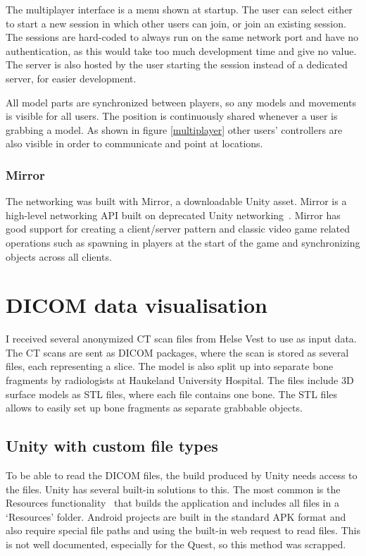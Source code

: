 \documentclass[a4paper]{report}
\begin{document}
The multiplayer interface is a menu shown at startup. The user can select either to start a new session in which other users can join, or join an existing session. The sessions are hard-coded to always run on the same network port and have no authentication, as this would take too much development time and give no value. The server is also hosted by the user starting the session instead of a dedicated server, for easier development.

All model parts are synchronized between players, so any models and movements is visible for all users. The position is continuously shared whenever a user is grabbing a model. As shown in figure \ref{multiplayer} other users' controllers are also visible in order to communicate and point at locations.


\subsubsection{Mirror}
The networking was built with Mirror, a downloadable Unity asset. Mirror is a high-level networking API built on deprecated Unity networking~\cite{noauthor_mirror_nodate}. Mirror has good support for creating a client/server pattern and classic video game related operations such as spawning in players at the start of the game and synchronizing objects across all clients.

\section{DICOM data visualisation}
I received several anonymized CT scan files from Helse Vest to use as input data. The CT scans are sent as DICOM packages, where the scan is stored as several files, each representing a slice.
The model is also split up into separate bone fragments by radiologists at Haukeland University Hospital. The files include 3D surface models as STL files, where each file contains one bone. The STL files allows to easily set up bone fragments as separate grabbable objects.


\subsection{Unity with custom file types}

To be able to read the DICOM files, the build produced by Unity needs access to the files. Unity has several built-in solutions to this.
The most common is the Resources functionality~\cite{resourcesload_unity_nodate} that builds the application and includes all files in a `Resources' folder. Android projects are built in the standard APK format and also require special file paths and using the built-in web request to read files. This is not well documented, especially for the Quest, so this method was scrapped.
\end{document}
